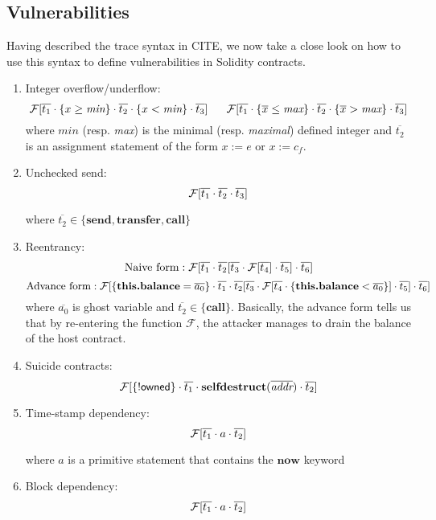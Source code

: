 \subsection{Vulnerabilities}

Having described the trace syntax in CITE, we now take a close look on how to use this syntax to define vulnerabilities in Solidity contracts.
\begin{enumerate}
	\item Integer overflow/underflow:
	$$
	\mathcal{F}[\overline{t_1} \cdot \{x \geq \textit{min}\} \cdot \overline{t_2} \cdot \{x < \textit{min}\} \cdot \overline{t_3}]
	~~~~~
	\mathcal{F}[\overline{t_1} \cdot \{\overline{x} \leq \textit{max}\} \cdot \overline{t_2} \cdot \{\overline{x} > \textit{max}\} \cdot \overline{t_3}]
	$$
	where $\textit{min}$ (resp. \textit{max}) is the minimal (resp. \textit{maximal}) defined integer and $\overline{t_2}$ is an assignment statement of the form $x:=e$ or $x:=c_f$.
	\item Unchecked send:
	$$
	\mathcal{F}[\overline{t_1} \cdot \overline{t_2} \cdot \overline{t_3}]
	$$
	
	where $\overline{t_2} \in \{\textbf{send},\textbf{transfer},\textbf{call}\}$
	\item Reentrancy:
	$$
	\textrm{Naive form}: \mathcal{F}[\overline{t_1} \cdot \overline{t_2}[\overline{t_3} \cdot \mathcal{F}[\overline{t_4}] \cdot \overline{t_5}] \cdot \overline{t_6}]
	$$
		$$
	\textrm{Advance form}: \mathcal{F}[\{\textbf{this.balance} = \overline{a_0}\} 
	\cdot \overline{t_1} \cdot \overline{t_2}[\overline{t_3} \cdot \mathcal{F}[\overline{t_4} \cdot \{\textbf{this.balance} < \overline{a_0}\}] \cdot \overline{t_5}] \cdot \overline{t_6}]
	$$
	where $\overline{a_0}$ is ghost variable and $\overline{t_2} \in \{\textbf{call}\}$. Basically, the advance form tells us that by re-entering the function $\mathcal{F}$, the attacker manages to drain the balance of the host contract.
	\item Suicide contracts:
	$$
	\mathcal{F}[\{!\textsf{owned}\} \cdot \overline{t_1} \cdot \textbf{selfdestruct}(\overline{\textit{addr}}) \cdot \overline{t_2}]
	$$
	\item Time-stamp dependency:
	$$
\mathcal{F}[\overline{t_1} \cdot a \cdot \overline{t_2}]
$$

where $a$ is a primitive statement that contains the $\textbf{now}$ keyword

	\item Block dependency:
	$$
	\mathcal{F}[\overline{t_1} \cdot a \cdot \overline{t_2}]
	$$
	

\end{enumerate}

